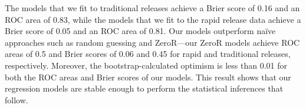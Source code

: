 \begin{sloppypar}
\noindent\DIFdelbegin \textit{\textbf{}%
}%
\DIFdelend \DIFaddbegin {}
\DIFaddend The models that we fit to traditional releases achieve a Brier score of 0.16 and
an ROC area of 0.83, while the models that we fit to the rapid release data
achieve a Brier score of 0.05 and an ROC area of 0.81. Our models outperform
na\"{i}ve approaches such as random guessing and ZeroR---our ZeroR models
achieve ROC areas of 0.5 and Brier scores of 0.06 and 0.45 for rapid and
traditional releases, respectively. Moreover, the bootstrap-calculated optimism
is less than 0.01 for both the ROC areas and Brier scores of our models. This
result shows that our regression models are stable enough to perform the
statistical inferences that follow.\\


\end{sloppypar}
